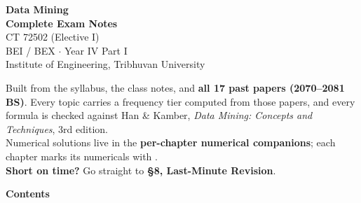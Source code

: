 \documentclass[10pt]{article}
\begin{document}
\thispagestyle{empty}
\vspace*{2.2cm}
\begin{center}
  {\Huge\bfseries\color{acc} Data Mining}\\[6pt]
  {\LARGE\bfseries Complete Exam Notes}\\[14pt]
  {\large\color{sub} CT 72502 (Elective I)}\\[3pt]
  {\color{sub} BEI / BEX $\cdot$ Year IV Part I}\\[3pt]
  {\color{sub} Institute of Engineering, Tribhuvan University}\\[22pt]
  \begin{minipage}{0.76\textwidth}
    \color{sub}\small
    Built from the syllabus, the class notes, and \textbf{all 17 past papers
    (2070--2081 BS)}. Every topic carries a frequency tier computed from those papers,
    and every formula is checked against Han \& Kamber, \emph{Data Mining: Concepts and
    Techniques}, 3rd edition.\\[8pt]
    Numerical solutions live in the \textbf{per-chapter numerical companions};
    each chapter marks its numericals with .\\[8pt]
    \textbf{Short on time?} Go straight to \textbf{§8, Last-Minute Revision}.
  \end{minipage}
\end{center}

\vfill

\vspace{1.4cm}

\cleardoublepage
\pagestyle{fancy}
{\Large\bfseries\color{acc} Contents}
\vspace{-6pt}{\color{acc}\rule{\textwidth}{1.1pt}}\vspace{4pt}
\begingroup
\renewcommand{\contentsname}{}
\setcounter{tocdepth}{1}
\vspace{-24pt}
\tableofcontents
\endgroup

\cleardoublepage

\cleardoublepage

\cleardoublepage

\cleardoublepage

\cleardoublepage

\cleardoublepage

\cleardoublepage




\cleardoublepage

\end{document}
